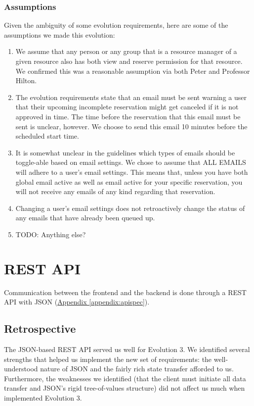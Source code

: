 \documentclass[12pt]{article}
\begin{document}
\subsubsection{Assumptions}
Given the ambiguity of some evolution requirements, here are some of the assumptions we made this evolution:
\begin{enumerate}
    \item We assume that any person or any group that is a resource manager of a given resource also has both view and reserve permission for that resource. We confirmed this was a reasonable assumption via both Peter and Professor Hilton. 
    \item The evolution requirements state that an email must be sent warning a user that their upcoming incomplete reservation might get canceled if it is not approved in time. The time before the reservation that this email must be sent is unclear, however. We choose to send this email 10 minutes before the scheduled start time. 
    \item It is somewhat unclear in the guidelines which types of emails should be toggle-able based on email settings. We chose to assume that ALL EMAILS will adhere to a user's email settings. This means that, unless you have both global email active as well as email active for your specific reservation, you will not receive any emails of any kind regarding that reservation. 
    \item Changing a user's email settings does not retroactively change the status of any emails that have already been queued up. 
    \item {\huge TODO: Anything else?} 
\end{enumerate}



\section{REST API}
\label{sec:REST}
Communication between the frontend and the backend is done through a REST API with JSON (\hyperref[appendix:apispec]{Appendix \ref{appendix:apispec}}).

\subsection{Retrospective}
The JSON-based REST API served us well for Evolution 3. We identified several strengths that helped us implement the new set of requirements: the well-understood nature of JSON and the fairly rich state transfer afforded to us. Furthermore, the weaknesses we identified (that the client must initiate all data transfer and JSON's rigid tree-of-values structure) did not affect us much when implemented Evolution 3.
\end{document}
